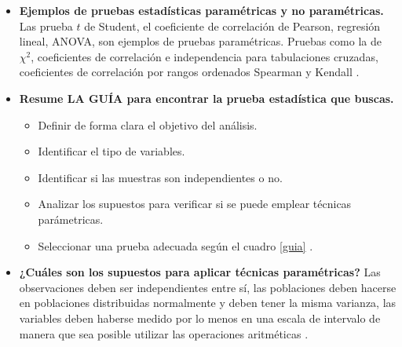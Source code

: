 \documentclass[12pt,letterpaper]{article}
\begin{document}
\begin{itemize}
	\item \textbf{Ejemplos de pruebas estadísticas paramétricas y no paramétricas.} Las prueba $t$ de Student, el coeficiente de correlación de Pearson, regresión lineal, ANOVA, son ejemplos de pruebas paramétricas. Pruebas como la de $\chi^2$, coeficientes de correlación e independencia para tabulaciones cruzadas, coeficientes de correlación por rangos ordenados Spearman y Kendall \cite{ecured}.
	\item \textbf{Resume LA GUÍA  para encontrar la prueba estadística que buscas. }
	\begin{itemize}
		\item Definir de forma clara el objetivo del análisis.
		\item Identificar el tipo de variables.
		\item Identificar si las muestras son independientes o no. 
		\item Analizar los supuestos para verificar si se puede emplear técnicas parámetricas.
		\item Seleccionar una prueba adecuada según el cuadro \ref{guia} \cite{guia}.
	\end{itemize}
	\item \textbf{¿Cuáles son los supuestos para aplicar técnicas paramétricas?} Las observaciones deben ser independientes entre sí, las poblaciones deben hacerse en poblaciones distribuidas normalmente y deben tener la misma varianza, las variables deben haberse medido por lo menos en una escala de intervalo de manera que sea posible utilizar las operaciones aritméticas \cite{ecured}.
\end{itemize}
\end{document}
